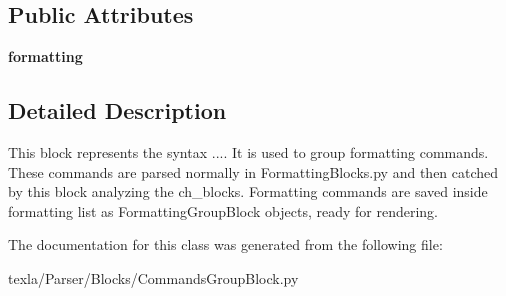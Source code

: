 \subsection*{Public Attributes}
\begin{DoxyCompactItemize}
\item 
\hypertarget{classtexla_1_1Parser_1_1Blocks_1_1CommandsGroupBlock_1_1CommandsGroupBlock_a59010e7a5f58f96a12cb32b843271313}{}\label{classtexla_1_1Parser_1_1Blocks_1_1CommandsGroupBlock_1_1CommandsGroupBlock_a59010e7a5f58f96a12cb32b843271313} 
{\bfseries formatting}
\end{DoxyCompactItemize}


\subsection{Detailed Description}
\begin{DoxyVerb}This block represents the syntax {...}.
It is used to group formatting commands.
These commands are parsed normally in FormattingBlocks.py
and then catched by this block analyzing the ch_blocks.
Formatting commands are saved inside formatting list
as FormattingGroupBlock objects, ready for rendering.
\end{DoxyVerb}
 

The documentation for this class was generated from the following file\+:\begin{DoxyCompactItemize}
\item 
texla/\+Parser/\+Blocks/Commands\+Group\+Block.\+py\end{DoxyCompactItemize}

